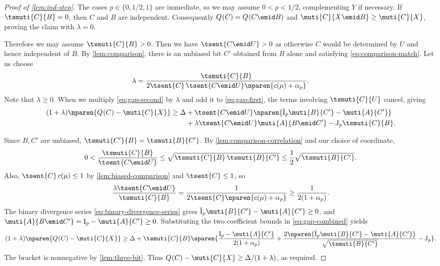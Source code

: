 \begin{proof}[Proof of \autoref{lem:ind-step}]
The cases $p\in\{0,1/2,1\}$ are immediate, so we may assume
$0<p<1/2$, complementing $Y$ if necessary.
If $\tsmuti{C}{B}=0$, then $C$ and $B$ are independent.
Consequently $\qent{C}=\qent{C\emid B}$ and
$\muti{C}{X\emid B}\ge\muti{C}{X}$, proving the claim with
$\lambda=0$.

Therefore we may assume $\tsmuti{C}{B}>0$.
Then we have $\tsent{C\emid U}>0$ as otherwise $C$ would be
determined by $U$ and hence independent of $B$. By
\autoref{lem:comparison}, there is an unbiased bit $C'$
obtained from $B$ alone and satisfying
\eqref{eq:comparison-match}.
Let us choose
\begin{equation*}
  \lambda=
  \frac{\tsmuti{C}{B}}
  {2\tsent{C}\,\tsent{C\emid U}
  \nparen{c(\mu)+\alpha_p}}.
\end{equation*}
Note that $\lambda\ge 0$. When we multiply \eqref{eq:gap-second} by
$\lambda$ and add it to \eqref{eq:gap-first},
the terms involving $\tsmuti{C}{U}$ cancel, giving
\begin{equation}
  \label{eq:gap-combined}
  \begin{aligned}
    (1+\lambda)\nparen{\qent{C}-\muti{C}{X}}\ge\Delta
    &+\tsent{C\emid U}
    \nparen{\qI\muti{B}{C'}-\muti{A}{C'}}\\
    &+\lambda\tsent{C\emid U}\muti{A}{B\emid C'}
    -\qJ\tsmuti{C}{B}.
  \end{aligned}
\end{equation}

Since $B,C'$ are unbiased, $\tsmuti{C'}{B}=\tsmuti{B}{C'}$.
By \autoref{lem:comparison-correlation} and our choice of coordinate,
\begin{equation*}
  0<\frac{\tsmuti{C}{B}}{\tsent{C\emid U}}
  \le\sqrt{\tsmuti{C}{B}\,\tsmuti{B}{C'}}
  \le\frac12\sqrt{\tsmuti{B}{C'}}.
\end{equation*}
Also, $\tsent{C}\,c(\mu)\le1$ by \autoref{lem:biased-comparison}
and $\tsent{C}\le1$, so
\begin{equation*}
  \frac{\lambda\tsent{C\emid U}}{\tsmuti{C}{B}}
  =\frac1{2\tsent{C}
  \nparen{c(\mu)+\alpha_p}}
  \ge\frac1{2(1+\alpha_p)}.
\end{equation*}
The binary divergence series \eqref{eq:binary-divergence-series} gives
$\qI\muti{B}{C'}-\muti{A}{C'}\ge0$, and
$\muti{A}{B\emid C'}=\sI-\muti{A}{C'}\ge0$.
Substituting the two coefficient bounds in \eqref{eq:gap-combined} yields
\begin{align*}
 (1+\lambda)\nparen{\qent{C}-\muti{C}{X}}
 \ge \Delta+\tsmuti{C}{B}\sparen{
  \frac{\sI-\muti{A}{C'}}{2(1+\alpha_p)}
  +\frac{2\nparen{\qI\muti{B}{C'}-\muti{A}{C'}}}{\sqrt{\tsmuti{B}{C'}}}
  -\qJ}.
\end{align*}
The bracket is nonnegative by \autoref{lem:three-bit}. Thus
$\qent{C}-\muti{C}{X}\ge\Delta/(1+\lambda)$, as required.
\end{proof}

